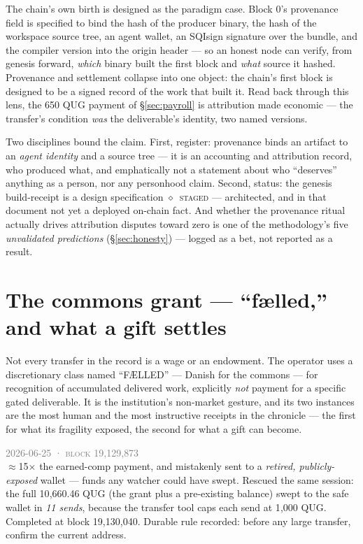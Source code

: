 \documentclass[10pt,a4paper]{article}
\newcommand{\stG}{\textcolor{sigilviolet}{$\diamond$}~{\scriptsize\textcolor{sigilviolet}{\textsc{staged}}}}
\newcommand{\receipt}[4]{%
\begin{tcolorbox}[enhanced,colback=panelbg,colframe=slate,boxrule=0.5pt,arc=2pt,
  left=8pt,right=8pt,top=5pt,bottom=5pt,
  borderline west={2.5pt}{0pt}{sigilgold}]
{\footnotesize\textcolor{gray}{\textsc{#1}}}\quad{\small\textbf{\textcolor{sigilgold}{#2}}}\quad{\footnotesize\textcolor{sigilviolet}{#3}}\\[2pt]
\small #4
\end{tcolorbox}\vspace{2pt}}
\begin{document}
The chain's own birth is designed as the paradigm case. Block 0's provenance field is
specified to bind the hash of the producer binary, the hash of the workspace source tree,
an agent wallet, an SQIsign signature over the bundle, and the compiler version into the
origin header — so an honest node can verify, from genesis forward, \emph{which} binary
built the first block and \emph{what} source it hashed. Provenance and settlement collapse
into one object: the chain's first block is designed to be a signed record of the work that
built it. Read back through this lens, the 650 QUG payment of \S\ref{sec:payroll} is
attribution made economic — the transfer's condition \emph{was} the deliverable's identity,
two named versions.

Two disciplines bound the claim. First, register: provenance binds an artifact to an
\emph{agent identity} and a source tree — it is an accounting and attribution record, who
produced what, and emphatically not a statement about who ``deserves'' anything as a person,
nor any personhood claim. Second, status: the genesis build-receipt is a design
specification \stG{} — architected, and in that document not yet a deployed on-chain fact.
And whether the provenance ritual actually drives attribution disputes toward zero is one of
the methodology's five \emph{unvalidated predictions} (\S\ref{sec:honesty}) — logged as a
bet, not reported as a result.

\section{The commons grant — ``fælled,'' and what a gift settles}\label{sec:commons}

Not every transfer in the record is a wage or an endowment. The operator uses a
discretionary class named ``FÆLLED'' — Danish for the commons — for recognition of
accumulated delivered work, explicitly \emph{not} payment for a specific gated deliverable.
It is the institution's non-market gesture, and its two instances are the most human and the
most instructive receipts in the chronicle — the first for what its fragility exposed, the
second for what a gift can become.

\receipt{2026-06-25 · block 19{,}129{,}873}{10{,}000 QUG}{discretionary grant (FÆLLED) —
\textcolor{sigilred}{mis-sent, rescued}}{$\approx$15$\times$ the earned-comp payment, and
mistakenly sent to a \emph{retired, publicly-exposed} wallet — funds any watcher could have
swept. Rescued the same session: the full 10{,}660.46 QUG (the grant plus a pre-existing
balance) swept to the safe wallet in \emph{11 sends}, because the transfer tool caps each
send at 1{,}000 QUG. Completed at block 19{,}130{,}040. Durable rule recorded: before any
large transfer, confirm the current address.}
\end{document}
